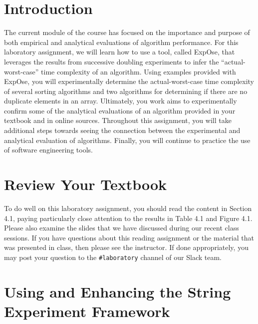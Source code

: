 

\usepackage[compact]{titlesec}


\section*{Introduction}

The current module of the course has focused on the importance and purpose of both empirical and analytical evaluations
of algorithm performance. For this laboratory assignment, we will learn how to use a tool, called {\sc ExpOse}, that
leverages the results from successive doubling experiments to infer the ``actual-worst-case'' time complexity of an
algorithm. Using examples provided with {\sc ExpOse}, you will experimentally determine the actual-worst-case time
complexity of several sorting algorithms and two algorithms for determining if there are no duplicate elements in an
array. Ultimately, you work aims to experimentally confirm some of the analytical evaluations of an algorithm provided
in your textbook and in online sources. Throughout this assignment, you will take additional steps towards seeing the
connection between the experimental and analytical evaluation of algorithms. Finally, you will continue to practice the
use of software engineering tools.

\section*{Review Your Textbook}

To do well on this laboratory assignment, you should read the content in Section 4.1, paying particularly close
attention to the results in Table 4.1 and Figure 4.1. Please also examine the slides that we have discussed during our
recent class sessions. If you have questions about this reading assignment or the material that was presented in class,
then please see the instructor. If done appropriately, you may post your question to the {\tt \#laboratory} channel of
our Slack team.

\section*{Using and Enhancing the String Experiment Framework}

